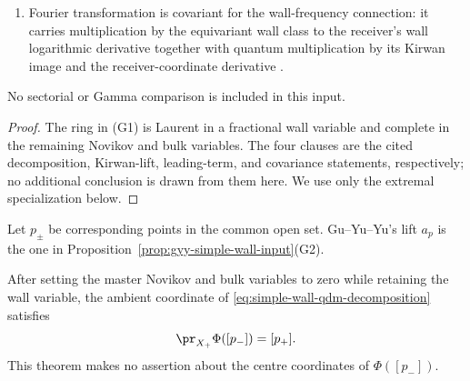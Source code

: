 \begin{proposition}
\begin{enumerate}[label=\textup{(G\arabic*)}]
an isomorphism after this base change
\cite[Proposition~5.2, Lemmas~5.8 and~5.10, Proposition~5.9 and
Theorem~5.5, pp.~37, 42--44]{GuYuYu}.  The receiver coordinate carries no
\(z\): it lies in \(H^*(X_+)[\![C^\vee,\theta]\!]\) and vanishes at
\(\theta=q_{\mathrm w}=0\) \cite[Corollary~4.19, p.~36]{GuYuYu}.
\item Fourier transformation is covariant for the wall-frequency connection:
it carries multiplication by the equivariant wall class to the receiver's
wall logarithmic derivative together with quantum multiplication by its
Kirwan image and the receiver-coordinate derivative
\cite[Proposition~4.14(2), p.~32; Proposition~4.21, p.~36]{GuYuYu}.
\end{enumerate}
No sectorial or Gamma comparison is included in this input.
\end{proposition}

\begin{proof}
The ring in \textup{(G1)} is Laurent in a fractional wall variable and
complete in the remaining Novikov and bulk variables.  The four clauses are
the cited decomposition, Kirwan-lift, leading-term, and covariance statements,
respectively; no additional conclusion is drawn from them here.  We use only
the extremal specialization below.
\end{proof}

Let \(p_\pm\) be corresponding points in the common open set.  Gu--Yu--Yu's
lift \(a_p\) is the one in
Proposition~\ref{prop:gyy-simple-wall-input}\textup{(G2)}.

\begin{theorem}
\label{thm:simple-wall-point-column}
After setting the master Novikov and bulk variables to zero while retaining
the wall variable, the ambient coordinate of
\eqref{eq:simple-wall-qdm-decomposition} satisfies
\begin{equation}\label{eq:simple-wall-point-column}
 \pr_{X_+}\Phi([p_-])=[p_+].
\end{equation}
This theorem makes no assertion about the centre coordinates of
\(\Phi([p_-])\).
\end{theorem}


